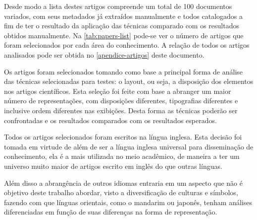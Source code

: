 
Desde modo a lista destes artigos compreende um total de 100 documentos variados, com seus metadados já extraídos manualmente e todos catalogados a fim de ter o resultado da aplicação das técnicas comparado com os resultados obtidos manualmente. Na \autoref{tab:papers-list} pode-se ver o número de artigos que foram selecionados por cada área do conhecimento. A relação de todos os artigos analisados pode ser obtida no \autoref{apendice-artigos} deste documento.

Os artigos foram selecionados tomando como base a principal forma de análise das técnicas selecionadas para testes: o layout, ou seja, a disposição dos elementos nos artigos científicos. Esta seleção foi feite com base a abranger um maior número de representações, com disposições diferentes, tipografias diferentes e inclusive ordem diferentes nas exibições. Desta forma as técnicas poderão ser confrontadas e os resultados comparados com os resultados esperados.


Todos os artigos selecionados foram escritos na língua inglesa. Esta decisão foi tomada em virtude de além de ser a língua inglesa universal para disseminação de conhecimento, ela é a mais utilizada no meio acadêmico, de maneira a ter um universo muito maior de artigos escrito em inglês do que outras línguas.

Além disso a abrangência de outros idiomas entraria em um aspecto que não é objetivo deste trabalho abordar, visto a diversificação de culturas e símbolos, fazendo com que línguas orientais, como o mandarim ou japonês, tenham análises diferenciadas em função de suas diferenças na forma de representação.

